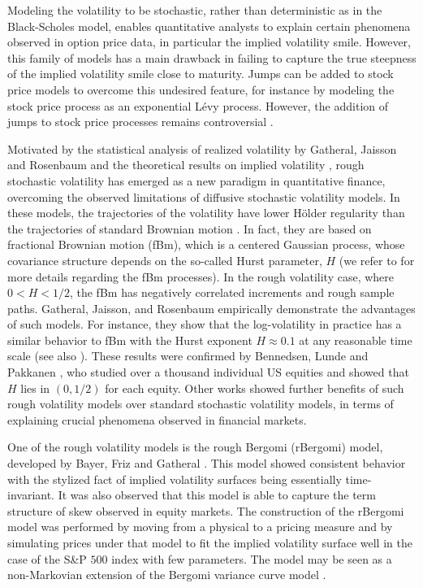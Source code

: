 Modeling the volatility to be stochastic, rather than deterministic as in the Black-Scholes model, enables quantitative analysts to  explain certain phenomena observed in option price data, in particular the implied volatility smile. However, this family of models has a  main drawback in failing  to capture the true steepness of the implied volatility smile close to maturity. Jumps can be added to stock price models to overcome this undesired feature, for instance by modeling the stock price process as an exponential L\'evy process. However, the addition of jumps to stock price processes remains controversial \cite{christensen2014fact,bajgrowicz2015jumps}. 



Motivated by the statistical analysis of realized volatility by Gatheral, Jaisson and Rosenbaum \cite{gatheral2018volatility} and the theoretical results on implied volatility    \cite{alos2007short,fukasawa2011asymptotic}, rough stochastic volatility has emerged as a new paradigm in quantitative finance, overcoming the observed limitations of  diffusive stochastic volatility models. In these models, the trajectories of the volatility  have lower H\"older regularity than the trajectories of standard Brownian motion \cite{bayer2016pricing,gatheral2018volatility}. In fact, they are based on fractional Brownian motion (fBm), which  is a centered Gaussian process, whose covariance structure depends on  the so-called Hurst parameter, $H$ (we refer to  \cite{mandelbrot1968fractional,coutin07introduction,biagini2008stochastic} for more details regarding the fBm processes). In the rough volatility case, where $0<H<1/2$, the fBm has negatively correlated increments and rough sample paths.   Gatheral, Jaisson, and Rosenbaum \cite{gatheral2018volatility}  empirically demonstrate the advantages of such models. For instance, they show that the log-volatility in practice has a similar behavior to  fBm with the Hurst exponent $H \approx 0.1$ at any reasonable time scale (see also  \cite{gatheral2014volatility_2}).  These results were confirmed  by Bennedsen, Lunde and Pakkanen \cite{bennedsen2016decoupling}, who studied over a thousand individual US equities and showed that $H$ lies in $(0,1/2)$ for each equity. Other  works \cite{bennedsen2016decoupling,bayer2016pricing,gatheral2018volatility} showed further benefits of  such rough volatility models over  standard stochastic volatility models,   in terms of explaining crucial phenomena  observed in  financial markets.
 
One of the  rough volatility models is the rough Bergomi (rBergomi) model, developed by Bayer, Friz and Gatheral \cite{bayer2016pricing}. This model showed   consistent behavior with the stylized fact of implied volatility surfaces being essentially time-invariant. It was also observed that this model is able to capture the term structure of skew observed in equity markets. The construction of the rBergomi model was performed by  moving from a physical to a pricing measure and by simulating prices under that model to fit  the implied volatility surface well in the case of the S\&P $500$ index with few parameters. The model may be seen as a non-Markovian extension of the Bergomi variance curve model \cite{bergomi2005smile}.
 
